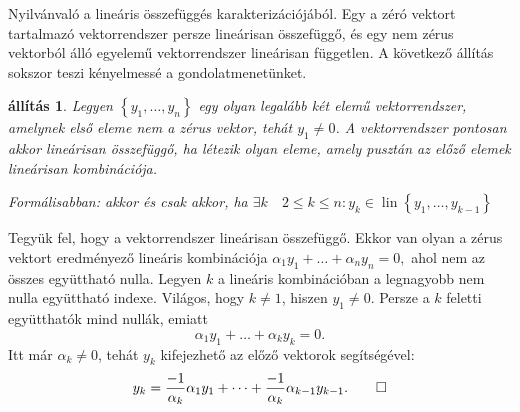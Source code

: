 \documentclass[a4paper, showtrims]{memoir}
\makeatletter
\renewenvironment{proof}[1][\proofname]
    {\par\pushQED{\qed}%
    \normalfont \topsep6\p@\@plus6\p@\relax
    \trivlist
    \item[\hskip\labelsep
        \itshape
    #1\@addpunct{:}]\ignorespaces}
    {\popQED\endtrivlist\@endpefalse}
\theoremstyle{plain}
\newtheorem{proposition}{állítás}[chapter]
\theoremstyle{remark}
\theoremstyle{definition}
\DeclareMathOperator{\lin}{lin}
\makeatother
\begin{document}
\begin{proof}
	Nyilvánvaló a lineáris összefüggés karakterizációjából.
\end{proof}
Egy a zéró vektort tartalmazó vektorrendszer persze lineárisan összefüggő,
és egy nem zérus vektorból álló egyelemű vektorrendszer lineárisan független.
A következő állítás sokszor teszi kényelmessé a gondolatmenetünket.
\begin{proposition}
	Legyen $\left\{ y_1,\ldots,y_n \right\}$ egy olyan legalább két elemű vektorrendszer,
	amelynek első eleme nem a zérus vektor, tehát $y_1\neq 0$.
	A vektorrendszer pontosan akkor lineárisan összefüggő,
	ha létezik olyan eleme,
	amely pusztán az előző elemek lineárisan kombinációja.

	Formálisabban: akkor és csak akkor,
	ha
	$\exists k\quad 2\leq k\leq n : y_k\in\lin\left\{ y_1,\ldots,y_{k-1} \right\}$
\end{proposition}
\begin{proof}
	Tegyük fel, hogy a vektorrendszer lineárisan összefüggő.
	Ekkor van olyan a zérus vektort eredményező lineáris kombinációja
	\(
	\alpha_1y_1+\dots+\alpha_ny_n=0,
	\)
	ahol nem az összes együttható nulla.
	Legyen $k$ a lineáris kombinációban a legnagyobb nem nulla együttható indexe.
	Világos, hogy $k\neq 1$,
	hiszen $y_1\neq 0$.
	Persze a $k$ feletti együtthatók mind nullák,
	emiatt
	\[
		\alpha_1y_1+\dots+\alpha_ky_k=0.
	\]
	Itt már $\alpha_k\neq 0$, tehát $y_k$ kifejezhető az előző vektorok segítségével:
	\[
		y_k=
		\frac{-1}{\alpha_k}\alpha_1y_1+\dots+\frac{-1}{\alpha_{k}}\alpha_{k-1}y_{k-1}.\qedhere
	\]
\end{proof}
\end{document}
